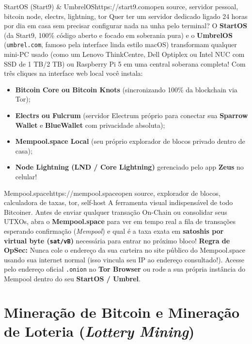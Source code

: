 \documentclass{pousadaguide}
\begin{document}
\begin{ferramenta}[goat,logo=start9,logo2=umbrel]{StartOS (Start9) \& UmbrelOS}{https://start9.com}{open source, servidor pessoal, bitcoin node, electrs, lightning, tor}
Quer ter um servidor dedicado ligado 24 horas por dia em casa sem precisar configurar nada na unha pelo terminal? O \textbf{StartOS} (da Start9, 100\% código aberto e focado em soberania pura) e o \textbf{UmbrelOS} (\texttt{umbrel.com}, famoso pela interface linda estilo macOS) transformam qualquer mini-PC usado (como um Lenovo ThinkCentre, Dell Optiplex ou Intel NUC com SSD de 1 TB/2 TB) ou Raspberry Pi 5 em uma central soberana completa! Com três cliques na interface web local você instala:
\begin{itemize}
  \item \textbf{Bitcoin Core ou Bitcoin Knots} (sincronizando 100\% da blockchain via Tor);
  \item \textbf{Electrs ou Fulcrum} (servidor Electrum próprio para conectar sua \textbf{Sparrow Wallet} e \textbf{BlueWallet} com privacidade absoluta);
  \item \textbf{Mempool.space Local} (seu próprio explorador de blocos privado dentro de casa);
  \item \textbf{Node Lightning (LND / Core Lightning)} gerenciado pelo app \textbf{Zeus} no celular!
\end{itemize}
\end{ferramenta}

\begin{ferramenta}[goat,logo=mempool]{Mempool.space}{https://mempool.space}{open source, explorador de blocos, calculadora de taxas, tor, self-host}
A ferramenta visual indispensável de todo Bitcoiner. Antes de enviar qualquer transação On-Chain ou consolidar seus UTXOs, abra o \textbf{Mempool.space} para ver em tempo real a fila de transações esperando confirmação (\emph{Mempool}) e qual é a taxa exata em \textbf{satoshis por virtual byte (\texttt{sat/vB})} necessária para entrar no próximo bloco! \textbf{Regra de OpSec:} Nunca cole o endereço da sua carteira no site público do Mempool.space usando sua internet normal (isso vincula seu IP ao endereço consultado!). Acesse pelo endereço oficial \texttt{.onion} no \textbf{Tor Browser} ou rode a sua própria instância do Mempool dentro do seu \textbf{StartOS / Umbrel}. 
\end{ferramenta}

\section{Mineração de Bitcoin e Mineração de Loteria (\emph{Lottery Mining})}
\end{document}
